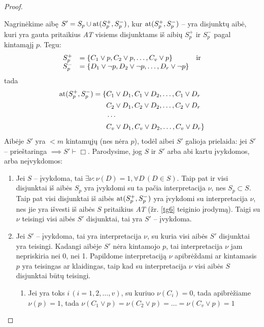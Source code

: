 \begin{prop}
\begin{proof}
\begin{description}
        Nagrinėkime aibę $S' = S_{p} \cup \operatorname{at}(S_{p}^{+}, S_{p}^{-})$,
        kur $\operatorname{at}(S_{p}^{+}, S_{p}^{-})$ – yra disjunktų aibė, kuri yra
        gauta pritaikius \emph{AT} visiems disjunktams iš aibių 
        $S_{p}^{+}$ ir $S_{p}^{-}$ pagal kintamąjį $p$. Tegu:
        \[
        \begin{array}{c l l}
          S_{p}^{+} & = \{C_1 \lor p, C_2 \lor p, \dotsc, C_v \lor p \}%
            & \text{ir} \\
          S_{p}^{-} & = \{D_1 \lor \neg p, D_2 \lor \neg p, \dotsc,%
            D_r \lor \neg p \} & {}
        \end{array}
        \]
        tada 
        \begin{align*}
          \at(S_{p}^{+}, S_{p}^{-}) = \{%
          & C_1 \lor D_1, C_1 \lor D_2, \dotsc, C_1 \lor D_r \\
          & C_2 \lor D_1, C_2 \lor D_2, \dotsc, C_2 \lor D_r \\
          & \cdots \\
          & C_v \lor D_1, C_v \lor D_2, \dotsc, C_v \lor D_r \}
        \end{align*}
        Aibėje $S'$ yra $< m$ kintamųjų (nes nėra $p$), todėl aibei 
        $S'$ galioja prielaida: jei $S'$ – prieštaringa 
        $\implies S' \vdash \Box$. Parodysime, jog $S$ ir $S'$ arba
        abi kartu įvykdomos, arba neįvykdomos:
        \begin{enumerate}
          \item Jei $S$ – įvykdoma, tai 
            $\exists \nu : \nu(D) = 1, \forall D \, (D \in S)$. Taip
            pat ir visi disjunktai iš aibės $S_{p}$ yra įvykdomi su 
            ta pačia interpretacija $\nu$, nes $S_{p} \subset S$.
            Taip pat visi disjunktai iš aibės $\operatorname{at}(S_{p}^{+}, S_{p}^{-})$
            yra įvykdomi su interpretacija $\nu$, nes jie yra išvesti iš
            aibės $S$ pritaikius \emph{AT} (žr. \ref{tg6} teiginio 
            įrodymą). Taigi su $\nu$ teisingi visi aibės $S'$ disjunktai,
            tai yra $S'$ – įvykdoma.
          \item Jei $S'$ – įvykdoma, tai yra interpretacija $\nu$, su kuria
            visi aibės $S'$ disjunktai yra teisingi. Kadangi aibėje 
            $S'$ nėra kintamojo $p$, tai interpretacija $\nu$ jam 
            nepriskiria nei 0, nei 1. Papildome interpretaciją $\nu$
            apibrėždami ar kintamasis $p$ yra teisingas ar klaidingas,
            taip kad su interpretacija $\nu$ visi aibės $S$ disjunktai
            būtų teisingi.
            \begin{enumerate}
              \item Jei yra toks $i \, (i=1,2,\dotsc,v)$, su kuriuo 
                $\nu(C_{i}) = 0$, tada apibrėžiame $\nu(p) = 1$, tada
                $\nu(C_1 \lor p) = \nu(C_2 \lor p) = \dots =%
                \nu(C_v \lor p) = 1$


\end{enumerate}
\end{enumerate}
\end{description}
\end{proof}
\end{prop}
